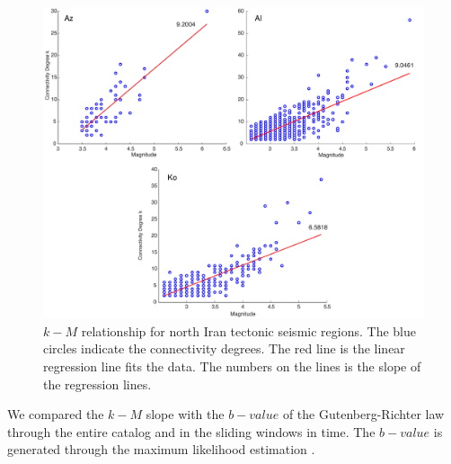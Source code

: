 \begin{figure} [ht]
\centering
\includegraphics[scale=0.35]{figures/pdf/Figure07.pdf} 
\caption{ $k-M$ relationship for north Iran tectonic seismic regions. The blue circles indicate the connectivity degrees. The red line is the linear regression line fits the data. The numbers on the lines is the slope of the regression lines.}
\label{fig:k_m_plot_m}
\end{figure}
 \noindent
We compared the  $k-M$  slope with the  $b-value$  of the Gutenberg-Richter law through the entire catalog and in the sliding windows in time. The  $b-value$  is generated through the maximum likelihood estimation  \citep{Aki1965} .

